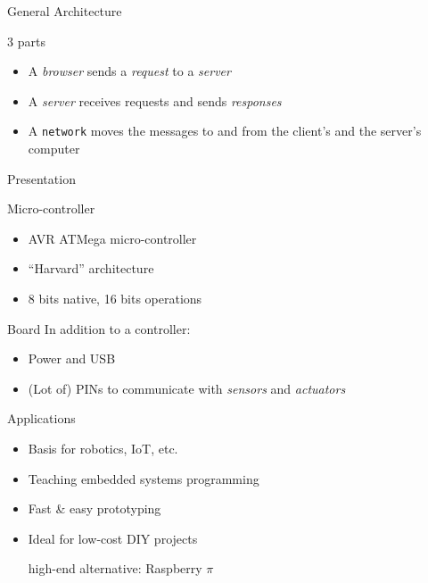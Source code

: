 \begin{reveals}
\begin{frame}[c]{General Architecture}
  
  \begin{block}{3 parts}
    \begin{itemize}
    \item A \emph{browser} sends a \emph{request} to a \emph{server}
    \item A \emph{server} receives requests and sends \emph{responses}
    \item A \texttt{network} moves the messages to and from the
      client's and the server's computer
    \end{itemize}
  \end{block}

\end{frame}


\begin{frame}[c]{}
  
\end{frame}


\begin{frame}[c]{Presentation}
  
  \begin{block}{Micro-controller}
    \begin{itemize}
    \item AVR ATMega micro-controller
    \item ``Harvard'' architecture
    \item 8 bits native, 16 bits operations
    \end{itemize}
  \end{block}

  \vfill

  \begin{block}{Board}
    In addition to a controller:
    \begin{itemize}
    \item Power and USB
    \item (Lot of) PINs to communicate with \emph{sensors} and
      \emph{actuators}
    \end{itemize}
  \end{block}
  \vfill

  \begin{block}{Applications}
    \begin{itemize}
    \item Basis for robotics, IoT, etc.
    \item Teaching embedded systems programming
    \item Fast \& easy prototyping
    \item Ideal for low-cost DIY projects
      \begin{center}
        \color{red}high-end alternative: Raspberry \(\pi\)
      \end{center}
    \end{itemize}
  \end{block}


\end{frame}
\end{reveals}
